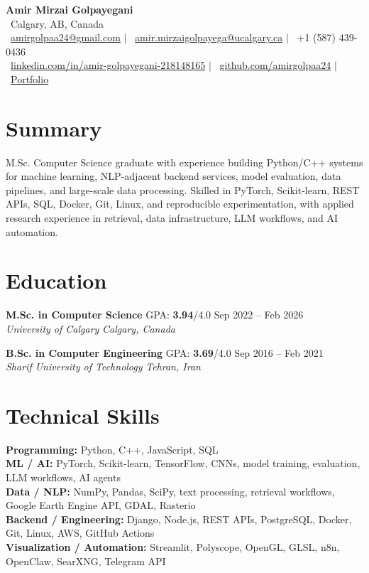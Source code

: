 \documentclass[a4paper,10pt]{article}
\newcommand{\resumeEducationSubheading}[5]{
    \textbf{#1} \hfill #2 \hfill #3 \\
    \textit{#4} \hfill \textit{#5}
}
\begin{document}
\begin{center}
    {\LARGE \textbf{Amir Mirzai Golpayegani}} \\[0.25em]
    \faMapMarker*~Calgary, AB, Canada \\[0.25em]
    \faEnvelope~\href{mailto:amirgolpaa24@gmail.com}{amirgolpaa24@gmail.com}
    $|$
    \faEnvelope~\href{mailto:amir.mirzaigolpayega@ucalgary.ca}{amir.mirzaigolpayega@ucalgary.ca}
    $|$
    \faPhone*~+1 (587) 439-0436 \\[0.25em]
    \faLinkedin~\href{https://linkedin.com/in/amir-golpayegani-218148165}{linkedin.com/in/amir-golpayegani-218148165}
    $|$
    \faGithub~\href{https://github.com/amirgolpaa24}{github.com/amirgolpaa24}
    $|$
    \faGlobe~\href{https://amir-portfolio-navy.vercel.app/}{Portfolio}
\end{center}

\section*{Summary}

M.Sc. Computer Science graduate with experience building Python/C++ systems for machine learning, NLP-adjacent backend services, model evaluation, data pipelines, and large-scale data processing. Skilled in PyTorch, Scikit-learn, REST APIs, SQL, Docker, Git, Linux, and reproducible experimentation, with applied research experience in retrieval, data infrastructure, LLM workflows, and AI automation.

\section*{Education}

\resumeEducationSubheading
{M.Sc. in Computer Science}
{GPA: \textbf{3.94}/4.0}
{Sep 2022 -- Feb 2026}
{University of Calgary}
{Calgary, Canada}

\vspace{0.35em}

\resumeEducationSubheading
{B.Sc. in Computer Engineering}
{GPA: \textbf{3.69}/4.0}
{Sep 2016 -- Feb 2021}
{Sharif University of Technology}
{Tehran, Iran}

\section*{Technical Skills}

\textbf{Programming:} Python, C++, JavaScript, SQL \\
\textbf{ML / AI:} PyTorch, Scikit-learn, TensorFlow, CNNs, model training, evaluation, LLM workflows, AI agents \\
\textbf{Data / NLP:} NumPy, Pandas, SciPy, text processing, retrieval workflows, Google Earth Engine API, GDAL, Rasterio \\
\textbf{Backend / Engineering:} Django, Node.js, REST APIs, PostgreSQL, Docker, Git, Linux, AWS, GitHub Actions \\
\textbf{Visualization / Automation:} Streamlit, Polyscope, OpenGL, GLSL, n8n, OpenClaw, SearXNG, Telegram API
\end{document}
